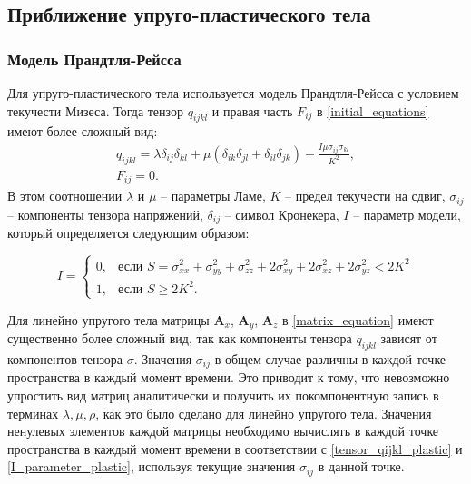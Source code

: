 
\clearpage
\newpage

\subsection{Приближение упруго-пластического тела}

\subsubsection{Модель Прандтля-Рейсса}
\label{plastic_matrixes}

Для упруго-пластического тела используется модель Прандтля-Рейсса с условием текучести Мизеса. Тогда тензор $q_{ijkl}$ и правая часть $F_{ij}$ в \ref{initial_equations} имеют более сложный вид:
\begin{eqnarray}
\label{tensor_qijkl_plastic}
q_{ijkl}=\lambda\delta_{ij}\delta_{kl}+\mu(\delta_{ik}\delta_{jl}+\delta_{il}\delta_{jk})-\frac{I\mu\sigma_{ij}\sigma_{kl}}{K^2},
\nonumber\\
F_{ij}=0.
\end{eqnarray}
В этом соотношении $\lambda$ и $\mu$ -- параметры Ламе, $K$ -- предел текучести на сдвиг, $\sigma_{ij}$ -- компоненты тензора напряжений, $\delta_{ij}$ -- символ Кронекера, $I$ -- параметр модели, который определяется следующим образом:

\begin{equation}
\label{I_parameter_plastic}
I=\begin{cases}
0, & \text{если $S = \sigma_{xx}^2+\sigma_{yy}^2+\sigma_{zz}^2+2\sigma_{xy}^2+2\sigma_{xz}^2+2\sigma_{yz}^2 < 2K^2$}\\
1, & \text{если $S \ge 2K^2$}.
\end{cases}
\end{equation}

Для линейно упругого тела матрицы $\mathbf{A}_x$, $\mathbf{A}_y$, $\mathbf{A}_z$ в \ref{matrix_equation} имеют существенно более сложный вид, так как компоненты тензора $q_{ijkl}$ зависят от компонентов тензора $\sigma$. Значения $\sigma_{ij}$ в общем случае различны в каждой точке пространства в каждый момент времени. Это приводит к тому, что невозможно упростить вид матриц аналитически и получить их покомпонентную запись в терминах $\lambda, \mu, \rho$, как это было сделано для линейно упругого тела. Значения ненулевых элементов каждой матрицы необходимо вычислять в каждой точке пространства в каждый момент времени в соответствии с \ref{tensor_qijkl_plastic} и \ref{I_parameter_plastic}, используя текущие значения $\sigma_{ij}$ в данной точке.

